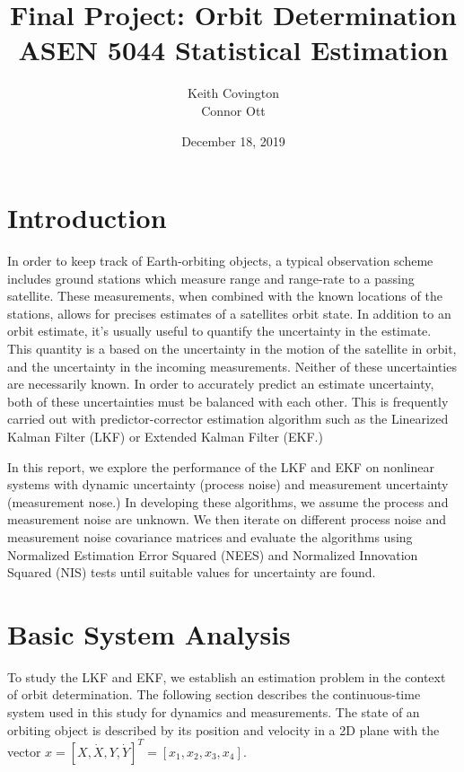 \documentclass[11pt, a4paper]{article}
\begin{document}
\title{Final Project: Orbit Determination\\ ASEN 5044 Statistical Estimation}
\author{Keith Covington\\Connor Ott}
\date{December 18, 2019}
\maketitle



\section*{Introduction}
In order to keep track of Earth-orbiting objects, a typical observation scheme includes ground stations which measure range and range-rate to a passing satellite. 
These measurements, when combined with the known locations of the stations, allows for precises estimates of a satellites orbit state. 
In addition to an orbit estimate, it's usually useful to quantify the uncertainty in the estimate. 
This quantity is a based on the uncertainty in the motion of the satellite in orbit, and the uncertainty in the incoming measurements. 
Neither of these uncertainties are necessarily known.
In order to accurately predict an estimate uncertainty, both of these uncertainties must be balanced with each other. 
This is frequently carried out with predictor-corrector estimation algorithm such as the Linearized Kalman Filter (LKF) or Extended Kalman Filter (EKF.)

In this report, we explore the performance of the LKF and EKF on nonlinear systems with dynamic uncertainty (process noise) and measurement uncertainty (measurement nose.) 
In developing these algorithms, we assume the process and measurement noise are unknown.
We then iterate on different process noise and measurement noise covariance matrices and evaluate the algorithms using Normalized Estimation Error Squared (NEES) and Normalized Innovation Squared (NIS) tests until suitable values for uncertainty are found. 

\section{Basic System Analysis}
\label{sec: Part I}

To study the LKF and EKF, we establish an estimation problem in the context of orbit determination. 
The following section describes the continuous-time system used in this study for dynamics and measurements.
The state of an orbiting object is described by its position and velocity in a 2D plane with the vector $x = [X, \dot{X}, Y, \dot{Y}]^T = [x_1, x_2, x_3, x_4]$.
\end{document}

